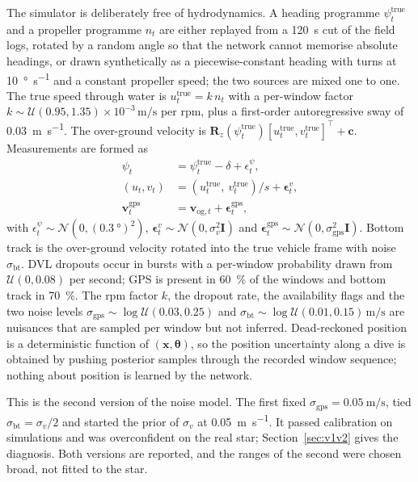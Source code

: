 \documentclass[conference]{IEEEtran}
\newcommand{\vect}[1]{\boldsymbol{#1}}
\newcommand{\btheta}{\vect{\theta}}
\newcommand{\bx}{\vect{x}}
\newcommand{\Rz}{\mathbf{R}_z}
\begin{document}
The simulator is deliberately free of hydrodynamics. A heading programme $\psi^{\mathrm{true}}_t$ and a propeller programme $n_t$ are either replayed from a \SI{120}{\second} cut of the field logs, rotated by a random angle so that the network cannot memorise absolute headings, or drawn synthetically as a piecewise-constant heading with turns at \SI{10}{\degree\per\second} and a constant propeller speed; the two sources are mixed one to one. The true speed through water is $u^{\mathrm{true}}_t = k\,n_t$ with a per-window factor $k \sim \mathcal{U}(0.95, 1.35)\times10^{-3}\,\si{\meter\per\second}$ per rpm, plus a first-order autoregressive sway of \SI{0.03}{\meter\per\second}. The over-ground velocity is $\Rz(\psi^{\mathrm{true}}_t)[u^{\mathrm{true}}_t, v^{\mathrm{true}}_t]^\top + \vect{c}$. Measurements are formed as
\begin{align}
\psi_t &= \psi^{\mathrm{true}}_t - \delta + \epsilon^\psi_t, \\
(u_t, v_t) &= (u^{\mathrm{true}}_t,\ v^{\mathrm{true}}_t)/s + \vect{\epsilon}^{v}_t, \\
\vect{v}^{\mathrm{gps}}_t &= \vect{v}_{\mathrm{og},t} + \vect{\epsilon}^{\mathrm{gps}}_t,
\end{align}
with $\epsilon^\psi_t \sim \mathcal{N}(0, (\SI{0.3}{\degree})^2)$, $\vect{\epsilon}^{v}_t \sim \mathcal{N}(0, \sigma_v^2 \mathbf{I})$ and $\vect{\epsilon}^{\mathrm{gps}}_t \sim \mathcal{N}(0, \sigma_{\mathrm{gps}}^2\mathbf{I})$. Bottom track is the over-ground velocity rotated into the true vehicle frame with noise $\sigma_{\mathrm{bt}}$. DVL dropouts occur in bursts with a per-window probability drawn from $\mathcal{U}(0, 0.08)$ per second; GPS is present in \SI{60}{\percent} of the windows and bottom track in \SI{70}{\percent}. The rpm factor $k$, the dropout rate, the availability flags and the two noise levels $\sigma_{\mathrm{gps}} \sim \log\mathcal{U}(0.03, 0.25)$ and $\sigma_{\mathrm{bt}} \sim \log\mathcal{U}(0.01, 0.15)\,\si{\meter\per\second}$ are nuisances that are sampled per window but not inferred. Dead-reckoned position is a deterministic function of $(\bx, \btheta)$, so the position uncertainty along a dive is obtained by pushing posterior samples through the recorded window sequence; nothing about position is learned by the network.

This is the second version of the noise model. The first fixed $\sigma_{\mathrm{gps}} = \SI{0.05}{\meter\per\second}$, tied $\sigma_{\mathrm{bt}} = \sigma_v/2$ and started the prior of $\sigma_v$ at \SI{0.05}{\meter\per\second}. It passed calibration on simulations and was overconfident on the real star; Section~\ref{sec:v1v2} gives the diagnosis. Both versions are reported, and the ranges of the second were chosen broad, not fitted to the star.
\end{document}
